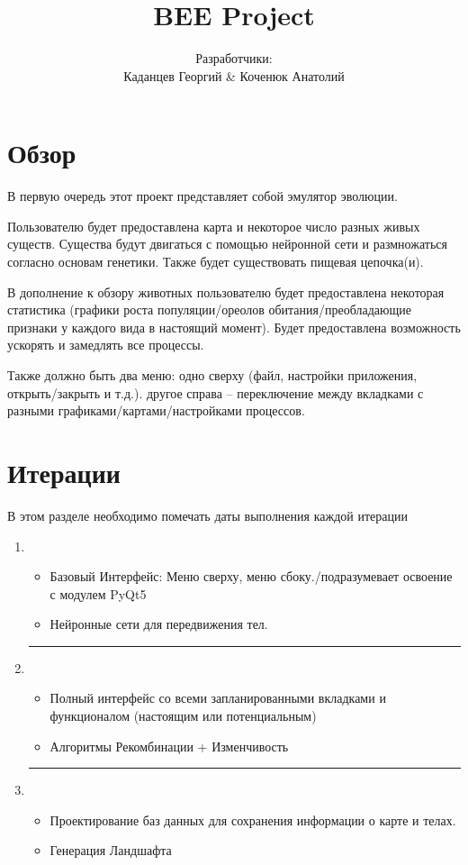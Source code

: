 \documentclass[12pt,a4paper, titlepage]{article}
\title{BEE Project}
\author{Разработчики: \\Каданцев Георгий \& Коченюк Анатолий}
\begin{document}
\maketitle
\section{Обзор}

В первую очередь этот проект представляет собой эмулятор эволюции. 

Пользователю будет предоставлена карта и некоторое число разных живых существ. Существа будут двигаться с помощью нейронной сети и размножаться согласно основам генетики. Также будет существовать пищевая цепочка(и).

В дополнение к обзору животных пользователю будет предоставлена некоторая статистика (графики роста популяции/ореолов обитания/преобладающие признаки у каждого вида в настоящий момент). Будет предоставлена возможность ускорять и замедлять все процессы. 

Также должно быть два меню: одно сверху (файл, настройки приложения, открыть/закрыть и т.д.). другое справа -- переключение между вкладками с разными графиками/картами/настройками процессов. 
\section{Итерации}
В этом разделе необходимо помечать даты выполнения каждой итерации
\begin{enumerate}
	\item 
	\begin{itemize}
		\item Базовый Интерфейс: Меню сверху, меню сбоку./подразумевает освоение с модулем PyQt5
		\item Нейронные сети для передвижения тел. 
	\end{itemize}
	\hrule
	\item 
	\begin{itemize}
		\item Полный интерфейс со всеми запланированными вкладками и функционалом (настоящим или потенциальным)
		\item Алгоритмы Рекомбинации + Изменчивость
	\end{itemize}
	\hrule
	\item 
	\begin{itemize}
		\item Проектирование баз данных для сохранения информации о карте и телах.
		\item Генерация Ландшафта
	\end{itemize}
\end{enumerate}
\end{document}
